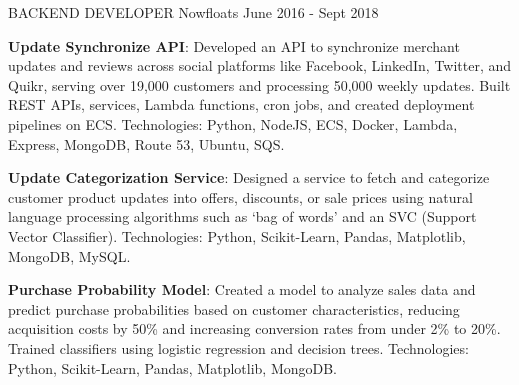 \begin{cventries}
{\begin{cvitems}
	\end{cvitems}
    }
\vspace{2em} %
  \cventry
    {BACKEND DEVELOPER} %
    {Nowfloats} %
    {} %
    {June 2016 - Sept 2018} %
    {
      \begin{cvitems} %
        \item{\textbf{Update Synchronize API}: Developed an API to synchronize merchant updates and reviews across social platforms like Facebook, LinkedIn, Twitter, and Quikr, serving over 19,000 customers and processing 50,000 weekly updates. \newline Built REST APIs, services, Lambda functions, cron jobs, and created deployment pipelines on ECS. \newline Technologies: Python, NodeJS, ECS, Docker, Lambda, Express, MongoDB, Route 53, Ubuntu, SQS.}
        \item{\textbf{Update Categorization Service}: Designed a service to fetch and categorize customer product updates into offers, discounts, or sale prices using natural language processing algorithms such as ‘bag of words’ and an SVC (Support Vector Classifier). \newline Technologies: Python, Scikit-Learn, Pandas, Matplotlib, MongoDB, MySQL.}
        \item{\textbf{Purchase Probability Model}: Created a model to analyze sales data and predict purchase probabilities based on customer characteristics, reducing acquisition costs by 50\% and increasing conversion rates from under 2\% to 20\%. \newline Trained classifiers using logistic regression and decision trees. \newline Technologies: Python, Scikit-Learn, Pandas, Matplotlib, MongoDB.}
      \end{cvitems}
    }

\end{cventries}